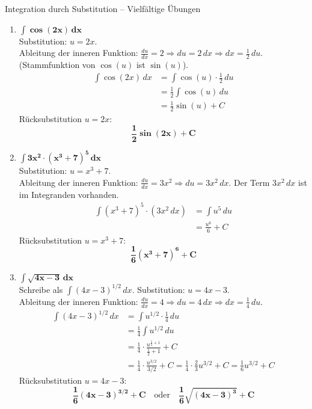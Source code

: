 \begin{loesungsumgebung}{Integration durch Substitution – Vielfältige Übungen}
\begin{enumerate}[label=(\alph*)]
    \item $\mathbf{\int \cos(2x) \,dx}$ \\
    Substitution: $u = 2x$. \\
    Ableitung der inneren Funktion: $\frac{du}{dx} = 2 \Rightarrow du = 2 \,dx \Rightarrow dx = \frac{1}{2} \,du$.
    (Stammfunktion von $\cos(u)$ ist $\sin(u)$).
    \begin{align*} \int \cos(2x) \,dx &= \int \cos(u) \cdot \frac{1}{2} \,du \\ &= \frac{1}{2} \int \cos(u) \,du \\ &= \frac{1}{2} \sin(u) + C \end{align*}
    Rücksubstitution $u=2x$:
    $$ \mathbf{\frac{1}{2}\sin(2x) + C} $$

    \item $\mathbf{\int 3x^2 \cdot (x^3+7)^5 \,dx}$ \\
    Substitution: $u = x^3+7$. \\
    Ableitung der inneren Funktion: $\frac{du}{dx} = 3x^2 \Rightarrow du = 3x^2 \,dx$.
    Der Term $3x^2 \,dx$ ist im Integranden vorhanden.
    \begin{align*} \int (x^3+7)^5 \cdot (3x^2 \,dx) &= \int u^5 \,du \\ &= \frac{u^6}{6} + C \end{align*}
    Rücksubstitution $u=x^3+7$:
    $$ \mathbf{\frac{1}{6}(x^3+7)^6 + C} $$

    \item $\mathbf{\int \sqrt{4x-3} \,dx}$ \\
    Schreibe als $\int (4x-3)^{1/2} \,dx$.
    Substitution: $u = 4x-3$. \\
    Ableitung der inneren Funktion: $\frac{du}{dx} = 4 \Rightarrow du = 4 \,dx \Rightarrow dx = \frac{1}{4} \,du$.
    \begin{align*} \int (4x-3)^{1/2} \,dx &= \int u^{1/2} \cdot \frac{1}{4} \,du \\ &= \frac{1}{4} \int u^{1/2} \,du \\ &= \frac{1}{4} \cdot \frac{u^{\frac{1}{2}+1}}{\frac{1}{2}+1} + C \\ &= \frac{1}{4} \cdot \frac{u^{3/2}}{3/2} + C = \frac{1}{4} \cdot \frac{2}{3} u^{3/2} + C = \frac{1}{6}u^{3/2} + C \end{align*}
    Rücksubstitution $u=4x-3$:
    $$ \mathbf{\frac{1}{6}(4x-3)^{3/2} + C} \quad \text{oder} \quad \mathbf{\frac{1}{6}\sqrt{(4x-3)^3} + C} $$


\end{enumerate}
\end{loesungsumgebung}
